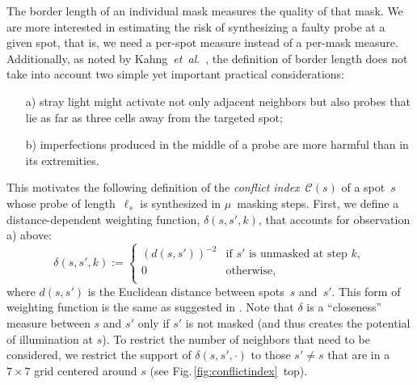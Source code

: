 \documentclass[runningheads]{llncs}
\begin{document}
The border length of an individual mask measures the quality of that
mask. We are more interested in estimating the risk of synthesizing a faulty
probe at a given spot, that is, we need a per-spot measure
instead of a per-mask measure. Additionally, as noted by Kahng~{\it et~al}.~\cite{KAHNG03A},
the definition of border length does not take into account two
simple yet important practical considerations:
\begin{itemize}
\item[a)] stray light might activate not only adjacent neighbors but
  also probes that lie as far as three cells away from the targeted
  spot;
\item[b)] imperfections produced in the middle of a probe are more
  harmful than in its extremities.
\end{itemize}
This motivates the following definition of the \emph{conflict
  index}~$\mathcal{C}(s)$ of a spot~$s$ whose probe of
length~$\ell_{s}$ is synthesized in $\mu$~masking steps. First, we
define a distance-dependent weighting function, $\delta(s,s',k)$, that
accounts for observation a) above:
\begin{equation}
\label{eq:dist_weight}
\delta(s,s',k) :=
        \left\{
                \begin{array}{ll}
                        (d(s,s'))^{-2} & \mbox{if $s'$ is unmasked at step $k$}, \\
                        0 & \mbox{otherwise}, \\
                \end{array}
        \right.
\end{equation}
where $d(s,s')$ is the Euclidean distance between spots~$s$ and~$s'$.
This form of weighting function is the same as suggested in
\cite{KAHNG03A}.  Note that $\delta$ is a ``closeness'' measure
between $s$ and $s'$ only if $s'$ is
not masked (and thus creates the potential of illumination at $s$). To
restrict the number of neighbors that need to be considered, we
restrict the support of $\delta(s,s',\cdot)$ to those $s'\neq s$ that
are in a $7\times 7$ grid centered around $s$ (see
Fig.\,\ref{fig:conflictindex}~top).
\end{document}
